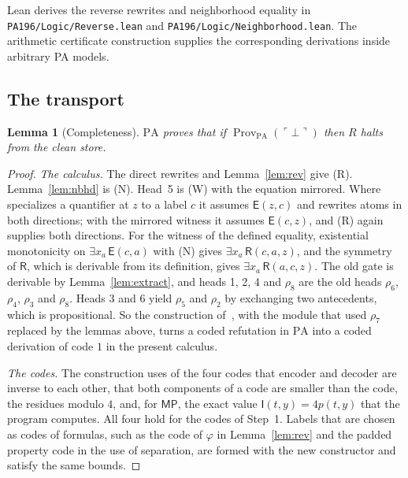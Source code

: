 \documentclass[11pt,letterpaper]{article}
\newtheorem{lemma}[theorem]{Lemma}
\newcommand{\PA}{\mathrm{PA}}
\newcommand{\Prov}{\operatorname{Prov}}
\newcommand{\mpc}{\mathsf{MP}}
\newcommand{\Ic}{\mathsf{I}}
\newcommand{\Ec}{\mathsf{E}}
\newcommand{\Rc}{\mathsf{R}}
\newcommand{\file}[1]{\texttt{\nolinkurl{#1}}}
\begin{document}
Lean derives the reverse rewrites and neighborhood equality in
\file{PA196/Logic/Reverse.lean} and
\file{PA196/Logic/Neighborhood.lean}. The arithmetic certificate
construction supplies the corresponding derivations inside arbitrary
PA models.

\subsection{The transport}

\begin{lemma}[Completeness]\label{lem:complete}
$\PA$ proves that if $\Prov_{\PA}(\ulcorner\bot\urcorner)$ then $R$
halts from the clean store.
\end{lemma}

\begin{proof}
\emph{The calculus.} The direct rewrites and Lemma~\ref{lem:rev} give
(R). Lemma~\ref{lem:nbhd} is (N). Head~5 is (W) with the equation
mirrored. Where~\cite{pa209} specializes a quantifier at $z$ to a
label $c$ it assumes $\Ec(z,c)$ and rewrites atoms in both directions;
with the mirrored witness it assumes $\Ec(c,z)$, and (R) again
supplies both directions. For the witness of the defined equality,
existential monotonicity on $\exists x_a\,\Ec(c,a)$ with (N) gives
$\exists x_a\,\Rc(c,a,z)$, and the symmetry of $\Rc$, which is
derivable from its definition, gives $\exists x_a\,\Rc(a,c,z)$. The
old gate is derivable by Lemma~\ref{lem:extract}, and heads 1, 2, 4
and $\rho_8$ are the old heads $\rho_6$, $\rho_4$, $\rho_3$ and
$\rho_8$. Heads 3 and 6 yield $\rho_5$ and $\rho_2$ by exchanging two
antecedents, which is propositional. So the construction
of~\cite[\S6.1]{pa209}, with the module that used $\rho_7$ replaced by
the lemmas above, turns a coded refutation in $\PA$ into a coded
derivation of code $1$ in the present calculus.

\emph{The codes.} The construction uses of the four codes that
encoder and decoder are inverse to each other, that both components of
a code are smaller than the code, the residues modulo $4$, and, for
$\mpc$, the exact value $\Ic(t,y)=4p(t,y)$ that the program computes.
All four hold for the codes of Step~1. Labels that are chosen as codes
of formulas, such as the code of $\varphi$ in Lemma~\ref{lem:rev} and
the padded property code in the use of separation, are formed with the
new constructor and satisfy the same bounds.


\end{proof}
\end{document}
